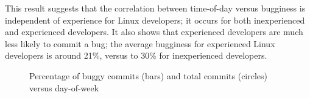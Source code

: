 This result suggests that the correlation between time-of-day versus
bugginess is independent of experience for Linux developers; it occurs
for both inexperienced and experienced developers. It also
shows that experienced developers are much less likely to commit a
bug; the average bugginess for experienced Linux developers is around
21\%, versus to 30\% for inexperienced developers. 

\begin{figure}[tbh]
\centering
{}
\caption{\label{fig-bugginess-day}Percentage of buggy commits (bars) and total
 commits (circles) versus day-of-week}
\end{figure}

